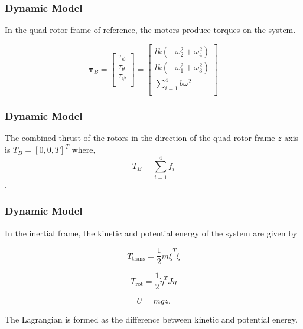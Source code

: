 \documentclass{beamer}
\begin{document}
\begin{frame}
\frametitle{Dynamic Model}


In the quad-rotor frame of reference, the motors produce torques on the system.

\begin{equation}
    \label{taub}
    \boldsymbol \tau_B = \left[ \begin{array}{c} \tau_{\phi}\\\tau_{\theta}\\\tau_{\psi}\\ \end{array} \right] = \left[ \begin{array}{c} l k (-\omega_2^2 + \omega_4^2)\\l k (-\omega_1^2 + \omega_3^2)\\ \displaystyle \sum \limits_{i=1}^4 b \omega^2\\\end{array} \right]
\end{equation}

\end{frame}




\begin{frame}
\frametitle{Dynamic Model}


The combined thrust of the rotors in the direction of the quad-rotor frame $z$ axis is $T_B = [0, 0, T]^T$ where,\\

\begin{equation}
    \label{totalThrust}
    T_B =  \displaystyle \sum \limits_{i=1}^4 f_i
\end{equation}.

\end{frame}



\begin{frame}
\frametitle{Dynamic Model}

In the inertial frame, the kinetic and potential energy of the system are given by

\begin{equation}
    T_{\text{trans}}=\frac{1}{2}m\dot{\xi }^T\dot{\xi }
\end{equation}


\begin{equation}
    T_{\text{rot}}= \frac{1}{2}\dot{\eta }^T J \dot{\eta }
\end{equation}


\begin{equation}
    U = m g z.
\end{equation}

The Lagrangian is formed as the difference between kinetic and potential energy.
\end{frame}
\end{document}
